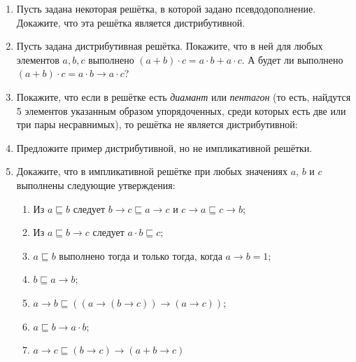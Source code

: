 \documentclass[10pt,a4paper,oneside]{article}
\begin{document}
\begin{enumerate}

\item Пусть задана некоторая решётка, в которой задано псевдодополнение.
Докажите, что эта решётка является дистрибутивной.

\item Пусть задана дистрибутивная решётка. Покажите, что в ней для любых элементов 
$a,b,c$ выполнено $(a+b)\cdot c = a\cdot b + a \cdot c$.
А будет ли выполнено $(a+b)\cdot c = a\cdot b \rightarrow a \cdot c$?

\item Покажите, что если в решётке есть \emph{диамант} или \emph{пентагон}
(то есть, найдутся 5 элементов указанным образом упорядоченных, среди которых есть две или 
три пары несравнимых), то решётка не является дистрибутивной:
\begin{center}\end{center}

\item Предложите пример дистрибутивной, но не импликативной решётки.

\item Докажите, что в импликативной решётке при любых значениях $a$, $b$ и $c$ 
выполнены следующие утверждения:

\begin{enumerate}
\item Из $a \sqsubseteq b$ следует $b\to c \sqsubseteq a\to c$ и $c\to a \sqsubseteq c \to b$;
\item Из $a \sqsubseteq b \to c$ следует $a \cdot b \sqsubseteq c$;
\item $a \sqsubseteq b$ выполнено тогда и только тогда, когда $a \to b = 1$;
\item $b \sqsubseteq a \rightarrow b$;
\item $a \rightarrow b \sqsubseteq ((a \rightarrow (b \rightarrow c)) \rightarrow (a \rightarrow c))$;
\item $a \sqsubseteq b \rightarrow a \cdot b$;
\item $a \rightarrow c \sqsubseteq (b \rightarrow c) \rightarrow (a + b \rightarrow c)$
\end{enumerate}


\end{enumerate}
\end{document}
